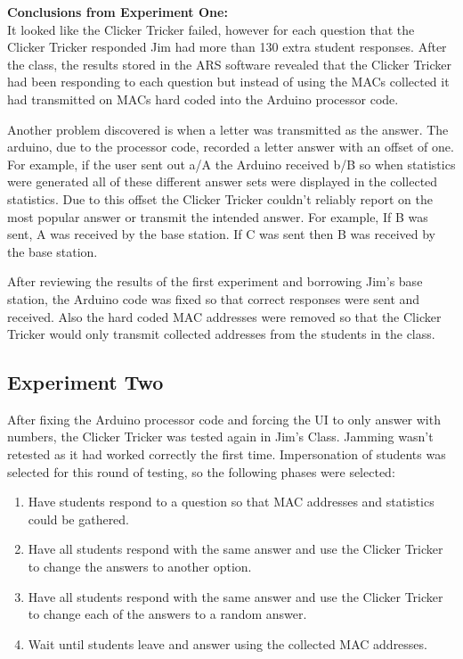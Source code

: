 \textbf{Conclusions from Experiment One:}\\ 
It looked like the Clicker Tricker failed, however for each question that the Clicker Tricker responded Jim had more than 130 extra student responses.  After the class, the results stored in the ARS software revealed that the Clicker Tricker had been responding to each question but instead of using the MACs collected it had transmitted on MACs hard coded into the Arduino processor code.

Another problem discovered is when a letter was transmitted as the answer. The arduino, due to the processor code, recorded a letter answer with an offset of one. For example, if the user sent out a/A the Arduino received b/B so when statistics were generated all of these different answer sets were displayed in the collected statistics.  Due to this offset the Clicker Tricker couldn't reliably report on the most popular answer or transmit the intended answer.  For example, If B was sent, A was received by the base station. If C was sent then B was received by the base station. 

After reviewing the results of the first experiment and borrowing Jim's base station, the Arduino code was fixed so that correct responses were sent and received.  Also the hard coded MAC addresses were removed so that the Clicker Tricker would only transmit collected addresses from the students in the class.

\subsection*{Experiment Two}

After fixing the Arduino processor code and forcing the UI to only answer with numbers, the Clicker Tricker was tested again in Jim's Class. Jamming wasn't retested as it had worked correctly the first time.  Impersonation of students was selected for this round of testing, so the following phases were selected:
 \begin{enumerate}
\item Have students respond to a question so that MAC addresses and statistics could be gathered.
\item Have all students respond with the same answer and use the Clicker Tricker to change the answers to another option.
\item Have all students respond with the same answer and use the Clicker Tricker to change each of the answers to a random answer.
\item Wait until students leave and answer using the collected MAC addresses.
\end{enumerate}

